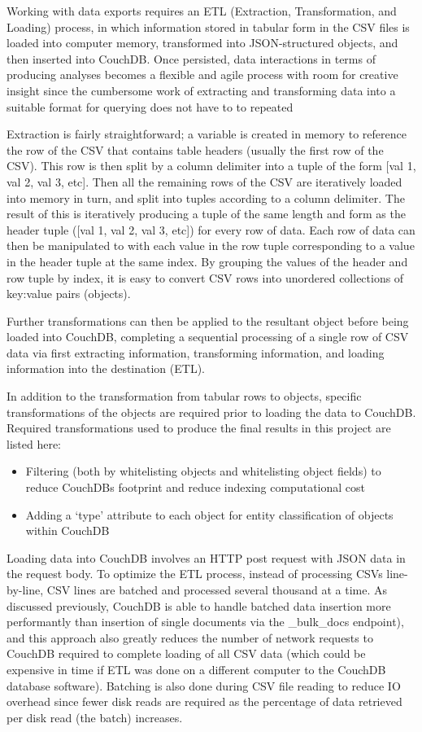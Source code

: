 Working with data exports requires an ETL (Extraction, Transformation, and Loading) process, in which information stored in tabular form in the CSV files is loaded into computer memory, transformed into JSON-structured objects, and then inserted into CouchDB. Once persisted, data interactions in terms of producing analyses becomes a flexible and agile process with room for creative insight since the cumbersome work of extracting and transforming data into a suitable format for querying does not have to to repeated

Extraction is fairly straightforward; a variable is created in memory to reference the row of the CSV that contains table headers (usually the first row of the CSV). This row is then split by a column delimiter into a tuple of the form [val 1, val 2, val 3, etc]. Then all the remaining rows of the CSV are iteratively loaded into memory in turn, and split into tuples according to a column delimiter. The result of this is iteratively producing a tuple of the same length and form as the header tuple ([val 1, val 2, val 3, etc]) for every row of data. Each row of data can then be manipulated to with each value in the row tuple corresponding to a value in the header tuple at the same index. By grouping the values of the header and row tuple by index, it is easy to convert CSV rows into unordered collections of key:value pairs (objects).

Further transformations can then be applied to the resultant object before being loaded into CouchDB, completing a sequential processing of a single row of CSV data via first extracting information, transforming information, and loading information into the destination (ETL).

In addition to the transformation from tabular rows to objects, specific transformations of the objects are required prior to loading the data to CouchDB. Required transformations used to produce the final results in this project are listed here:

\begin{itemize}
    \item Filtering (both by whitelisting objects and whitelisting object fields) to reduce CouchDBs footprint and reduce indexing computational cost
    \item Adding a `type' attribute to each object for entity classification of objects within CouchDB
\end{itemize}

Loading data into CouchDB involves an HTTP post request with JSON data in the request body. To optimize the ETL process, instead of processing CSVs line-by-line, CSV lines are batched and processed several thousand at a time. As discussed previously, CouchDB is able to handle batched data insertion more performantly than insertion of single documents via the \_bulk\_docs endpoint), and this approach also greatly reduces the number of network requests to CouchDB required to complete loading of all CSV data (which could be expensive in time if ETL was done on a different computer to the CouchDB database software). Batching is also done during CSV file reading to reduce IO overhead since fewer disk reads are required as the percentage of data retrieved per disk read (the batch) increases.

